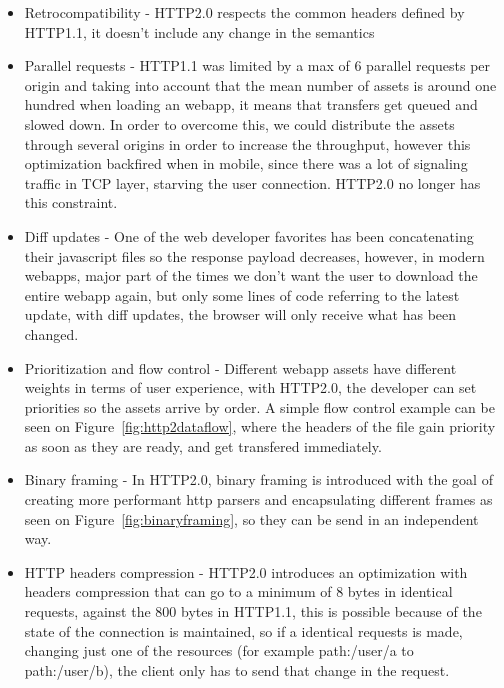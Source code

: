 \documentclass{./llncs2e/llncs}
\begin{document}
\begin{itemize}
  \item Retrocompatibility - HTTP2.0 respects the common headers defined by HTTP1.1, it doesn't include any change in the semantics
  \item Parallel requests - HTTP1.1 was limited by a max of 6 parallel requests per origin and taking into account that the mean number of assets is around one hundred when loading an webapp, it means that transfers get queued and slowed down. In order to overcome this, we could distribute the assets through several origins in order to increase the throughput, however this optimization backfired when in mobile, since there was a lot of signaling traffic in TCP layer, starving the user connection. HTTP2.0 no longer has this constraint.
  \item Diff updates - One of the web developer favorites has been concatenating their javascript files so the response payload decreases, however, in modern webapps, major part of the times we don't want the user to download the entire webapp again, but only some lines of code referring to the latest update, with diff updates, the browser will only receive what has been changed.
  \item Prioritization and flow control - Different webapp assets have different weights in terms of user experience, with HTTP2.0, the developer can set priorities so the assets arrive by order.  A simple flow control example can be seen on Figure~\ref{fig:http2dataflow}, where the headers of the file gain priority as soon as they are ready, and get transfered immediately. 
  \item Binary framing - In HTTP2.0, binary framing is introduced with the goal of creating more performant http parsers and encapsulating different frames as seen on Figure~\ref{fig:binaryframing}, so they can be send in an independent way.
  \item HTTP headers compression - HTTP2.0 introduces an optimization with headers compression\cite{Ruellan2013} that can go to a minimum of 8 bytes in identical requests, against the 800 bytes in HTTP1.1, this is possible because of the state of the connection is maintained, so if a identical requests is made, changing just one of the resources (for example path:/user/a to path:/user/b), the client only has to send that change in the request.
\end{itemize}
\end{document}
